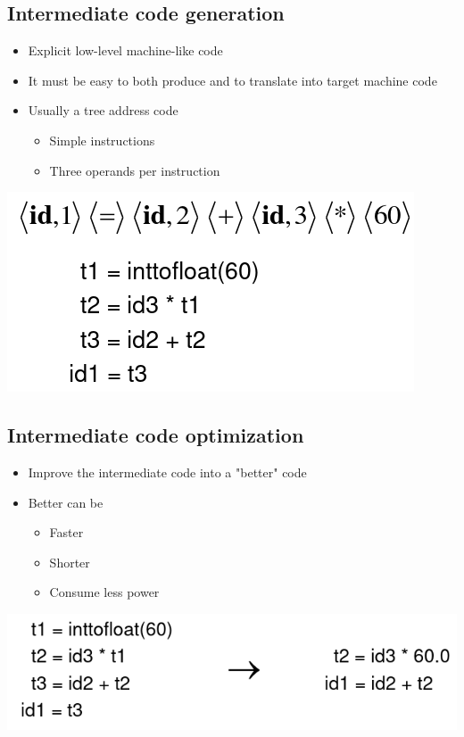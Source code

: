 \documentclass{article}[18pt]
\begin{document}
\subsection{Intermediate code generation}
\begin{itemize}
	\item Explicit low-level machine-like code
	\item It must be easy to both produce and to translate into target machine code
	\item Usually a tree address code
	\begin{itemize}
		\item Simple instructions
		\item Three operands per instruction
	\end{itemize}
\end{itemize}
\begin{center}
	\includegraphics[scale=0.7]{"Intermediate Code"}
\end{center}
\subsection{Intermediate code optimization}
\begin{itemize}
	\item Improve the intermediate code into a "better" code
	\item Better can be
	\begin{itemize}
		\item Faster
		\item Shorter
		\item Consume less power
	\end{itemize}
\end{itemize}
\begin{center}
	\includegraphics[scale=0.7]{optimization}
\end{center}
\end{document}
